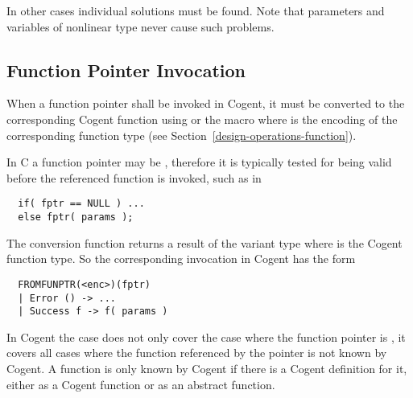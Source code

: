 In other cases individual solutions must be found. Note that parameters and variables of nonlinear type never
cause such problems.

\subsection{Function Pointer Invocation}
\label{app-transfunction-pointer}

When a function pointer  shall be invoked in Cogent, it must be converted to the corresponding Cogent function
using  or the macro  where  is the encoding of the 
corresponding function type (see Section~\ref{design-operations-function}).

In C a function pointer may be , therefore it is typically tested for being valid before the
referenced function is invoked, such as in 
\begin{verbatim}
  if( fptr == NULL ) ...
  else fptr( params );
\end{verbatim}
The conversion function  returns a result of the variant type  where  is the 
Cogent function type. So the corresponding invocation in Cogent has the form
\begin{verbatim}
  FROMFUNPTR(<enc>)(fptr)
  | Error () -> ...
  | Success f -> f( params )
\end{verbatim}

In Cogent the  case does not only cover the case where the function pointer is , it covers
all cases where the function referenced by the pointer is not known by Cogent. A function is only known by Cogent
if there is a Cogent definition for it, either as a Cogent function or as an abstract function.

